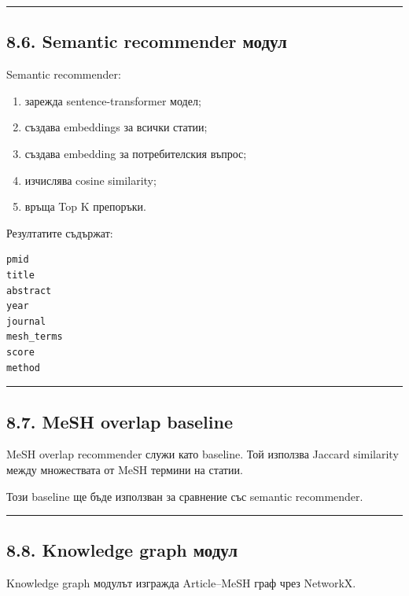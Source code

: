\documentclass[12pt,a4paper]{article}
\providecommand{\tightlist}{\setlength{\itemsep}{0pt}\setlength{\parskip}{0pt}}
\begin{document}
\vspace{0.5em}\hrule\vspace{1.0em}

\subsection{8.6. Semantic recommender модул}\label{semantic-recommender-ux43cux43eux434ux443ux43b}

Semantic recommender:

\begin{enumerate}
\def\labelenumi{\arabic{enumi}.}
\tightlist
\item
  зарежда sentence-transformer модел;
\item
  създава embeddings за всички статии;
\item
  създава embedding за потребителския въпрос;
\item
  изчислява cosine similarity;
\item
  връща Top K препоръки.
\end{enumerate}

Резултатите съдържат:

\begin{verbatim}
pmid
title
abstract
year
journal
mesh_terms
score
method
\end{verbatim}

\vspace{0.5em}\hrule\vspace{1.0em}

\subsection{8.7. MeSH overlap baseline}\label{mesh-overlap-baseline-1}

MeSH overlap recommender служи като baseline. Той използва Jaccard similarity между множествата от MeSH термини на статии.

Този baseline ще бъде използван за сравнение със semantic recommender.

\vspace{0.5em}\hrule\vspace{1.0em}

\subsection{8.8. Knowledge graph модул}\label{knowledge-graph-ux43cux43eux434ux443ux43b}

Knowledge graph модулът изгражда Article--MeSH граф чрез NetworkX.
\end{document}
